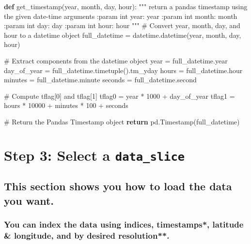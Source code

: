 \documentclass[
  letterpaper,
  DIV=11,
  numbers=noendperiod]{scrreprt}
\newenvironment{Shaded}{\begin{snugshade}}{\end{snugshade}}
\newcommand{\CommentTok}[1]{\textcolor[rgb]{0.37,0.37,0.37}{#1}}
\newcommand{\ControlFlowTok}[1]{\textcolor[rgb]{0.00,0.23,0.31}{\textbf{#1}}}
\newcommand{\DecValTok}[1]{\textcolor[rgb]{0.68,0.00,0.00}{#1}}
\newcommand{\KeywordTok}[1]{\textcolor[rgb]{0.00,0.23,0.31}{\textbf{#1}}}
\newcommand{\NormalTok}[1]{\textcolor[rgb]{0.00,0.23,0.31}{#1}}
\newcommand{\OperatorTok}[1]{\textcolor[rgb]{0.37,0.37,0.37}{#1}}
\begin{document}
\begin{Shaded}
\begin{Highlighting}[]
\KeywordTok{def}\NormalTok{ get\_timestamp(year, month, day, hour):}
    \CommentTok{"""}
\CommentTok{    return a pandas timestamp using the given date{-}time arguments}
\CommentTok{    :param int year: year}
\CommentTok{    :param int month: month}
\CommentTok{    :param int day: day}
\CommentTok{    :param int hour: hour}
\CommentTok{    """}
    \CommentTok{\# Convert year, month, day, and hour to a datetime object}
\NormalTok{    full\_datetime }\OperatorTok{=}\NormalTok{ datetime.datetime(year, month, day, hour)}
    
    \CommentTok{\# Extract components from the datetime object}
\NormalTok{    year }\OperatorTok{=}\NormalTok{ full\_datetime.year}
\NormalTok{    day\_of\_year }\OperatorTok{=}\NormalTok{ full\_datetime.timetuple().tm\_yday}
\NormalTok{    hours }\OperatorTok{=}\NormalTok{ full\_datetime.hour}
\NormalTok{    minutes }\OperatorTok{=}\NormalTok{ full\_datetime.minute}
\NormalTok{    seconds }\OperatorTok{=}\NormalTok{ full\_datetime.second}

    \CommentTok{\# Compute tflag[0] and tflag[1]}
\NormalTok{    tflag0 }\OperatorTok{=}\NormalTok{ year }\OperatorTok{*} \DecValTok{1000} \OperatorTok{+}\NormalTok{ day\_of\_year}
\NormalTok{    tflag1 }\OperatorTok{=}\NormalTok{ hours }\OperatorTok{*} \DecValTok{10000} \OperatorTok{+}\NormalTok{ minutes }\OperatorTok{*} \DecValTok{100} \OperatorTok{+}\NormalTok{ seconds}

    \CommentTok{\# Return the Pandas Timestamp object}
    \ControlFlowTok{return}\NormalTok{ pd.Timestamp(full\_datetime)}
\end{Highlighting}
\end{Shaded}

\section{\texorpdfstring{\textbf{Step 3: Select a
\texttt{data\_slice}}}{Step 3: Select a data\_slice}}\label{step-3-select-a-data_slice}

\subsection{This section shows you how to load the data you
want.}\label{this-section-shows-you-how-to-load-the-data-you-want.}

\subsubsection{You can index the data using indices, timestamps*,
latitude \& longitude, and by desired
resolution**.}\label{you-can-index-the-data-using-indices-timestamps-latitude-longitude-and-by-desired-resolution.}
\end{document}
